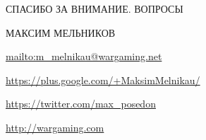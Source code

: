 \documentclass[aspectratio=169]{beamer}
\begin{document}
{
\begin{frame}[plain]{}
\end{frame}
}

{



\begin{frame}{СПАСИБО ЗА ВНИМАНИЕ. ВОПРОСЫ}
    \begin{block}{МАКСИМ МЕЛЬНИКОВ}
    \par \url{mailto:m\_melnikau@wargaming.net}
    \par \url{https://plus.google.com/+MaksimMelnikau/}
    \par \url{https://twitter.com/max\_posedon}
    \par \url{http://wargaming.com}
    \end{block}
\end{frame}
}
\end{document}
